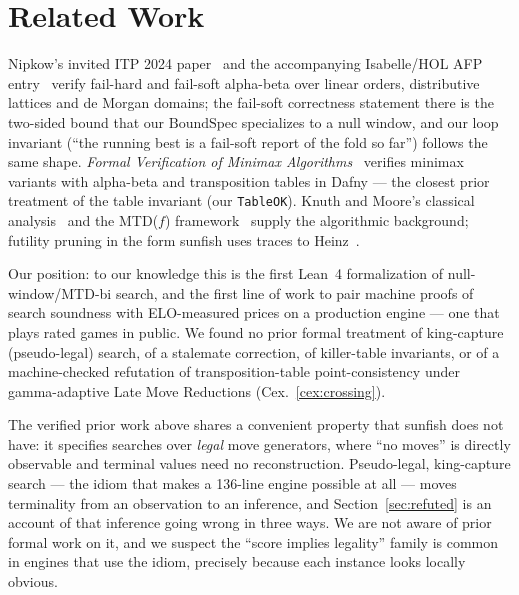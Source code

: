 \documentclass[11pt]{article}
\theoremstyle{plain}
\theoremstyle{definition}
\theoremstyle{remark}
\begin{document}
\section{Related Work}
\label{sec:related}

Nipkow's invited ITP 2024 paper~\cite{nipkow2024alphabeta} and the
accompanying Isabelle/HOL AFP entry~\cite{AlphaBetaPruningAFP} verify
fail-hard and fail-soft alpha-beta over linear orders, distributive
lattices and de Morgan domains; the fail-soft correctness statement
there is the two-sided bound that our $\mathrm{BoundSpec}$ specializes
to a null window, and our loop invariant (``the running best is a
fail-soft report of the fold so far'') follows the same shape.
\emph{Formal Verification of Minimax Algorithms}~\cite{dafnyMinimax}
verifies minimax variants with alpha-beta and transposition tables in
Dafny --- the closest prior treatment of the table invariant (our
\texttt{TableOK}).  Knuth and Moore's classical
analysis~\cite{knuth1975alphabeta} and the MTD($f$)
framework~\cite{plaat1996mtdf} supply the algorithmic background;
futility pruning in the form sunfish uses traces to
Heinz~\cite{heinz1998futility}.

Our position: to our knowledge this is the first Lean~4 formalization of
null-window/MTD-bi search, and the first line of work to pair machine
proofs of search soundness with ELO-measured prices on a production
engine --- one that plays rated games in public.  We found no prior
formal treatment of king-capture (pseudo-legal) search, of a stalemate
correction, of killer-table invariants, or of a machine-checked
refutation of transposition-table point-consistency under
gamma-adaptive Late Move Reductions (Cex.~\ref{cex:crossing}).

The verified prior work above shares a convenient property that sunfish
does not have: it specifies searches over \emph{legal} move
generators, where ``no moves'' is directly observable and terminal
values need no reconstruction.  Pseudo-legal, king-capture search ---
the idiom that makes a 136-line engine possible at all --- moves
terminality from an observation to an inference, and
Section~\ref{sec:refuted} is an account of that inference going wrong
in three ways.  We are not aware of prior formal work on it, and we
suspect the ``score implies legality'' family is common in engines that
use the idiom, precisely because each instance looks locally obvious.
\end{document}
